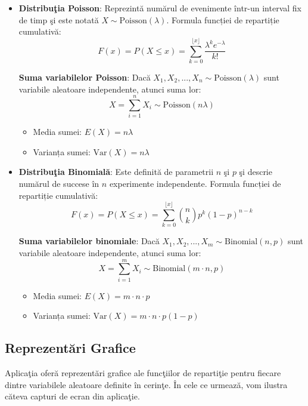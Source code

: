 \documentclass[a4paper,11pt]{article}
\begin{document}
\begin{itemize}
  \item \textbf{Distribu\c{t}ia Poisson}: Reprezint\u{a} num\u{a}rul de evenimente într-un interval fix de timp \c{s}i este notat\u{a} $X \sim \text{Poisson}(\lambda)$.
  \newline
  Formula funcției de repartiție cumulativă:
  \[
  F(x) = P(X \leq x) = \sum_{k=0}^{\lfloor x \rfloor} \frac{\lambda^k e^{-\lambda}}{k!}
  \]

  \textbf{Suma variabilelor Poisson}:  
  Dacă $X_1, X_2, ..., X_n \sim \text{Poisson}(\lambda)$ sunt variabile aleatoare independente, atunci suma lor:
  \[
  X = \sum_{i=1}^{n} X_i \sim \text{Poisson}(n\lambda)
  \]
  \begin{itemize}
    \item Media sumei: $E(X) = n\lambda$
    \item Varianța sumei: $\text{Var}(X) = n\lambda$
  \end{itemize}

  \item \textbf{Distribu\c{t}ia Binomial\u{a}}: Este definit\u{a} de parametrii $n$ \c{s}i $p$ \c{s}i descrie num\u{a}rul de succese în $n$ experimente independente.
  \newline
  Formula funcției de repartiție cumulativă:
  \[
  F(x) = P(X \leq x) = \sum_{k=0}^{\lfloor x \rfloor} \binom{n}{k} p^k (1 - p)^{n - k}
  \]

  \textbf{Suma variabilelor binomiale}:  
  Dacă $X_1, X_2, ..., X_m \sim \text{Binomial}(n, p)$ sunt variabile aleatoare independente, atunci suma lor:
  \[
  X = \sum_{i=1}^{m} X_i \sim \text{Binomial}(m \cdot n, p)
  \]
  \begin{itemize}
    \item Media sumei: $E(X) = m \cdot n \cdot p$
    \item Varianța sumei: $\text{Var}(X) = m \cdot n \cdot p (1 - p)$
  \end{itemize}

\end{itemize}

\newpage

\subsection*{Reprezent\u{a}ri Grafice}

Aplica\c{t}ia ofer\u{a} reprezent\u{a}ri grafice ale func\c{t}iilor de reparti\c{t}ie pentru fiecare dintre variabilele aleatoare definite în cerin\c{t}e. În cele ce urmeaz\u{a}, vom ilustra c\u{a}teva capturi de ecran din aplica\c{t}ie.
\end{document}
